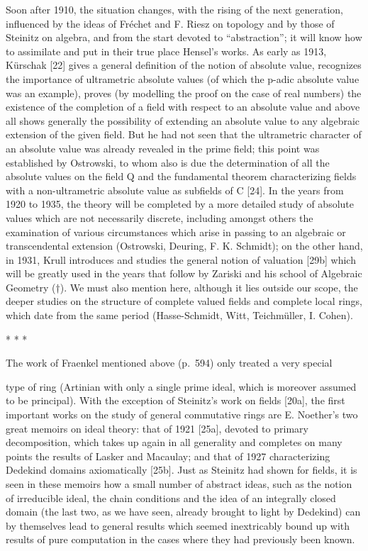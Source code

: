Soon after 1910, the situation changes, with the rising of the next generation, influenced by the ideas of Fréchet and F. Riesz on topology and by those of Steinitz on algebra, and from the start devoted to ``abstraction''; it will know how to assimilate and put in their true place Hensel's works. As early as 1913, Kürschak {[}22{]} gives a general definition of the notion of absolute value, recognizes the importance of ultrametric absolute values (of which the p-adic absolute value was an example), proves (by modelling the proof on the case of real numbers) the existence of the completion of a field with respect to an absolute value and above all shows generally the possibility of extending an absolute value to any algebraic extension of the given field. But he had not seen that the ultrametric character of an absolute value was already revealed in the prime field; this point was established by Ostrowski, to whom also is due the determination of all the absolute values on the field Q and the fundamental theorem characterizing fields with a non-ultrametric absolute value as subfields of C {[}24{]}. In the years from 1920 to 1935, the theory will be completed by a more detailed study of absolute values which are not necessarily discrete, including amongst others the examination of various circumstances which arise in passing to an algebraic or transcendental extension (Ostrowski, Deuring, F. K. Schmidt); on the other hand, in 1931, Krull introduces and studies the general notion of valuation {[}29b{]} which will be greatly used in the years that follow by Zariski and his school of Algebraic Geometry (†). We must also mention here, although it lies outside our scope, the deeper studies on the structure of complete valued fields and complete local rings, which date from the same period (Hasse-Schmidt, Witt, Teichmüller, I. Cohen).

\begin{center}* * *\end{center}

The work of Fraenkel mentioned above (p.~594) only treated a very special

type of ring (Artinian with only a single prime ideal, which is moreover assumed to be principal). With the exception of Steinitz's work on fields {[}20a{]}, the first important works on the study of general commutative rings are E. Noether's two great memoirs on ideal theory: that of 1921 {[}25a{]}, devoted to primary decomposition, which takes up again in all generality and completes on many points the results of Lasker and Macaulay; and that of 1927 characterizing Dedekind domains axiomatically {[}25b{]}. Just as Steinitz had shown for fields, it is seen in these memoirs how a small number of abstract ideas, such as the notion of irreducible ideal, the chain conditions and the idea of an integrally closed domain (the last two, as we have seen, already brought to light by Dedekind) can by themselves lead to general results which seemed inextricably bound up with results of pure computation in the cases where they had previously been known.

